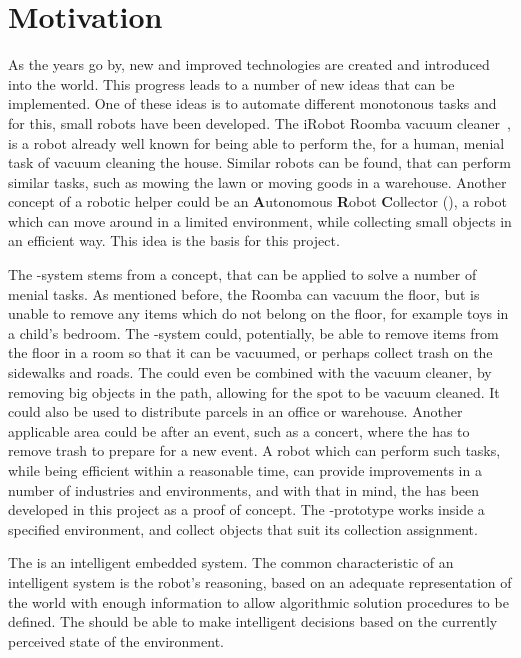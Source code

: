 \section{Motivation} \label{sec:motivation}

As the years go by, new and improved technologies are created and introduced into the world. This progress leads to a number of new ideas that can be implemented. One of these ideas is to automate different monotonous tasks and for this, small robots have been developed. The iRobot Roomba vacuum cleaner~\citep{roomba}, is a robot already well known for being able to perform the, for a human, menial task of vacuum cleaning the house. Similar robots can be found, that can perform similar tasks, such as mowing the lawn or moving goods in a warehouse. Another concept of a robotic helper could be an \textbf{A}utonomous \textbf{R}obot \textbf{C}ollector (\projname{}), a robot which can move around in a limited environment, while collecting small objects in an efficient way. This idea is the basis for this project.

The \projname{}-system stems from a concept, that can be applied to solve a number of menial tasks. As mentioned before, the Roomba can vacuum the floor, but is unable to remove any items which do not belong on the floor, for example toys in a child's bedroom. The \projname{}-system could, potentially, be able to remove items from the floor in a room so that it can be vacuumed, or perhaps collect trash on the sidewalks and roads. The \projname{} could even be combined with the vacuum cleaner, by removing big objects in the path, allowing for the spot to be vacuum cleaned. It could also be used to distribute parcels in an office or warehouse. Another applicable area could be after an event, such as a concert, where the \projname{} has to remove trash to prepare for a new event. A robot which can perform such tasks, while being efficient within a reasonable time, can provide improvements in a number of industries and environments, and with that in mind, the \projname{} has been developed in this project as a proof of concept. The \projname{}-prototype works inside a specified environment, and collect objects that suit its collection assignment. 

The \projname{} is an intelligent embedded system. The common characteristic of an intelligent system is the robot's reasoning, based on an adequate representation of the world with enough information to allow algorithmic solution procedures to be defined. The \projname{} should be able to make intelligent decisions based on the currently perceived state of the environment.

